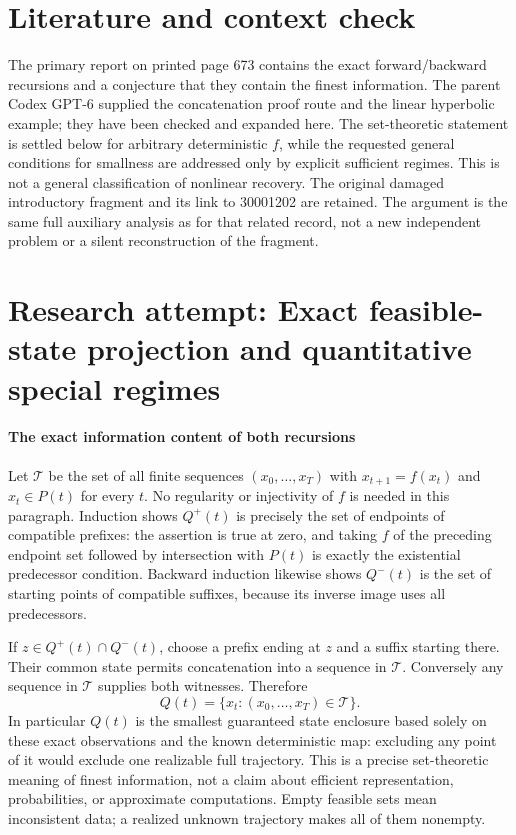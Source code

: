 \documentclass[11pt]{article}
\begin{document}
\section{Literature and context check}
The primary report on printed page 673 contains the exact forward/backward recursions and a conjecture that they contain the finest information. The parent Codex GPT-6 supplied the concatenation proof route and the linear hyperbolic example; they have been checked and expanded here. The set-theoretic statement is settled below for arbitrary deterministic $f$, while the requested general conditions for smallness are addressed only by explicit sufficient regimes. This is not a general classification of nonlinear recovery. The original damaged introductory fragment and its link to 30001202 are retained. The argument is the same full auxiliary analysis as for that related record, not a new independent problem or a silent reconstruction of the fragment.
\section{Research attempt: Exact feasible-state projection and quantitative special regimes}

\paragraph{The exact information content of both recursions}
Let $\mathcal T$ be the set of all finite sequences $(x_0,\ldots,x_T)$ with $x_{t+1}=f(x_t)$ and $x_t\in P(t)$ for every $t$. No regularity or injectivity of $f$ is needed in this paragraph. Induction shows $Q^+(t)$ is precisely the set of endpoints of compatible prefixes: the assertion is true at zero, and taking $f$ of the preceding endpoint set followed by intersection with $P(t)$ is exactly the existential predecessor condition. Backward induction likewise shows $Q^-(t)$ is the set of starting points of compatible suffixes, because its inverse image uses all predecessors.

If $z\in Q^+(t)\cap Q^-(t)$, choose a prefix ending at $z$ and a suffix starting there. Their common state permits concatenation into a sequence in $\mathcal T$. Conversely any sequence in $\mathcal T$ supplies both witnesses. Therefore
\[
 Q(t)=\{x_t:(x_0,\ldots,x_T)\in\mathcal T\}.
 \tag{1}
\]
In particular $Q(t)$ is the smallest guaranteed state enclosure based solely on these exact observations and the known deterministic map: excluding any point of it would exclude one realizable full trajectory. This is a precise set-theoretic meaning of finest information, not a claim about efficient representation, probabilities, or approximate computations. Empty feasible sets mean inconsistent data; a realized unknown trajectory makes all of them nonempty.
\end{document}
